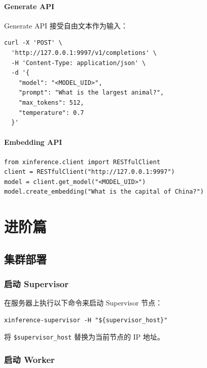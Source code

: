 \documentclass[12pt,UTF8]{ctexbook}
\begin{document}
\subsection{Generate API}

Generate API 接受自由文本作为输入：

\begin{lstlisting}
curl -X 'POST' \
  'http://127.0.0.1:9997/v1/completions' \
  -H 'Content-Type: application/json' \
  -d '{
    "model": "<MODEL_UID>",
    "prompt": "What is the largest animal?",
    "max_tokens": 512,
    "temperature": 0.7
  }'
\end{lstlisting}

\subsection{Embedding API}

\begin{lstlisting}
from xinference.client import RESTfulClient
client = RESTfulClient("http://127.0.0.1:9997")
model = client.get_model("<MODEL_UID>")
model.create_embedding("What is the capital of China?")
\end{lstlisting}

\part{进阶篇}

\chapter{集群部署}
\label{chap:cluster_deployment}

\section{启动 Supervisor}
\label{sec:start_supervisor}

在服务器上执行以下命令来启动 Supervisor 节点：

\begin{lstlisting}
xinference-supervisor -H "${supervisor_host}"
\end{lstlisting}

将 \texttt{\${supervisor\_host}} 替换为当前节点的 IP 地址。

\section{启动 Worker}
\label{sec:start_worker}
\end{document}
